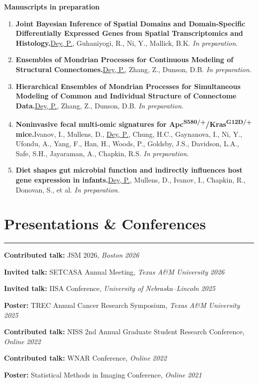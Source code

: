 \documentclass[11pt]{article}
\newcommand{\me}{\uline{Dey, P.}}
\newcommand{\SectionRule}{\vspace{-0.3em}\noindent\rule{\linewidth}{1.2pt}\vspace{0.6em}}
\begin{document}
\textbf{\large Manuscripts in preparation}
\begin{enumerate}
  \item \textbf{Joint Bayesian Inference of Spatial Domains and Domain-Specific Differentially Expressed Genes from Spatial Transcriptomics and Histology.}\quad \me, Guhaniyogi, R., Ni, Y., Mallick, B.K. \emph{In preparation}.

  \item \textbf{Ensembles of Mondrian Processes for Continuous Modeling of Structural Connectomes.}\quad  \me, Zhang, Z., Dunson, D.B. \emph{In preparation}.
  
  \item \textbf{Hierarchical Ensembles of Mondrian Processes for Simultaneous Modeling of Common and Individual Structure of Connectome Data.}\quad  \me, Zhang, Z., Dunson, D.B. \emph{In preparation}.
  
  \item \textbf{Noninvasive fecal multi-omic signatures for Apc\textsuperscript{S580/+}/Kras\textsuperscript{G12D/+} mice.}\quad  Ivanov, I., Mullens, D., \me, Chung, H.C., Gaynanova, I., Ni, Y., Ufondu, A., Yang, F., Han, H., Woods, P., Goldsby, J.S., Davidson, L.A., Safe, S.H., Jayaraman, A., Chapkin, R.S. \emph{In preparation}.
  
  \item \textbf{Diet shapes gut microbial function and indirectly influences host gene expression in infants.}\quad  \me, Mullens, D., Ivanov, I., Chapkin, R., Donovan, S., et al. \emph{In preparation}.
\end{enumerate}

\section*{Presentations \& Conferences}
\SectionRule

\begin{etaremune}
  \item \textbf{Contributed talk:} JSM 2026, \textit{Boston} \hfill \textit{2026}
  \item \textbf{Invited talk:} SETCASA Annual Meeting, \textit{Texas A\&M University} \hfill \textit{2026}
  \item \textbf{Invited talk:} IISA Conference, \textit{University of Nebraska--Lincoln} \hfill \textit{2025}
  \item \textbf{Poster:} TREC Annual Cancer Research Symposium, \textit{Texas A\&M University} \hfill \textit{2025}
  \item \textbf{Contributed talk:} NISS 2nd Annual Graduate Student Research Conference, \textit{Online} \hfill \textit{2022}
  \item \textbf{Contributed talk:} WNAR Conference, \textit{Online} \hfill \textit{2022}
  \item \textbf{Poster:} Statistical Methods in Imaging Conference, \textit{Online} \hfill \textit{2021}
\end{etaremune}
\end{document}
